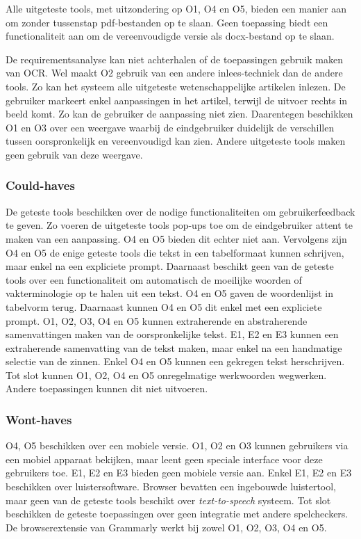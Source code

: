 Alle uitgeteste tools, met uitzondering op O1, O4 en O5, bieden een manier aan om zonder tussenstap pdf-bestanden op te slaan. Geen toepassing biedt een functionaliteit aan om de vereenvoudigde versie als docx-bestand op te slaan.

\medspace

De requirementsanalyse kan niet achterhalen of de toepassingen gebruik maken van OCR. Wel maakt O2 gebruik van een andere inlees-techniek dan de andere tools. Zo kan het systeem alle uitgeteste wetenschappelijke artikelen inlezen. De gebruiker markeert enkel aanpassingen in het artikel, terwijl de uitvoer rechts in beeld komt. Zo kan de gebruiker de aanpassing niet zien. Daarentegen beschikken O1 en O3 over een weergave waarbij de eindgebruiker duidelijk de verschillen tussen oorspronkelijk en vereenvoudigd kan zien. Andere uitgeteste tools maken geen gebruik van deze weergave.

\subsubsection{Could-haves}

De geteste tools beschikken over de nodige functionaliteiten om gebruikerfeedback te geven. Zo voeren de uitgeteste tools pop-ups toe om de eindgebruiker attent te maken van een aanpassing. O4 en O5 bieden dit echter niet aan. Vervolgens zijn O4 en O5 de enige geteste tools die tekst in een tabelformaat kunnen schrijven, maar enkel na een expliciete prompt. Daarnaast beschikt geen van de geteste tools over een functionaliteit om automatisch de moeilijke woorden of vakterminologie op te halen uit een tekst. O4 en O5 gaven de woordenlijst in tabelvorm terug. Daarnaast kunnen O4 en O5 dit enkel met een expliciete prompt. O1, O2, O3, O4 en O5 kunnen extraherende en abstraherende samenvattingen maken van de oorspronkelijke tekst. E1, E2 en E3 kunnen een extraherende samenvatting van de tekst maken, maar enkel na een handmatige selectie van de zinnen. Enkel O4 en O5 kunnen een gekregen tekst herschrijven. Tot slot kunnen O1, O2, O4 en O5 onregelmatige werkwoorden wegwerken. Andere toepassingen kunnen dit niet uitvoeren.


\subsubsection{Wont-haves}

O4, O5 beschikken over een mobiele versie. O1, O2 en O3 kunnen gebruikers via een mobiel apparaat bekijken, maar leent geen speciale interface voor deze gebruikers toe. E1, E2 en E3 bieden geen mobiele versie aan. Enkel E1, E2 en E3 beschikken over luistersoftware. Browser bevatten een ingebouwde luistertool, maar geen van de geteste tools beschikt over \textit{text-to-speech} systeem. Tot slot beschikken de geteste toepassingen over geen integratie met andere spelcheckers. De browserextensie van Grammarly werkt bij zowel O1, O2, O3, O4 en O5.


